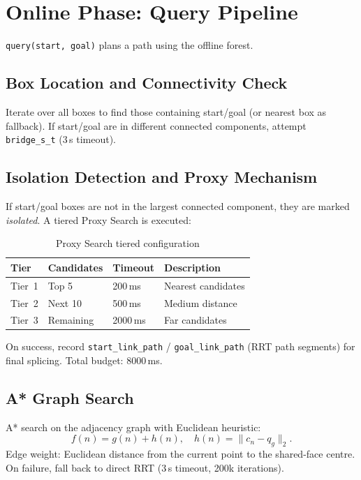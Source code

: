 \documentclass[journal]{IEEEtran}
\begin{document}
\section{Online Phase: Query Pipeline}\label{sec:query}

\texttt{query(start, goal)} plans a path using the offline forest.

\subsection{Box Location and Connectivity Check}

Iterate over all boxes to find those containing start/goal
(or nearest box as fallback).
If start/goal are in different connected components, attempt
\texttt{bridge\_s\_t} (3\,s timeout).

\subsection{Isolation Detection and Proxy Mechanism}

If start/goal boxes are not in the largest connected component,
they are marked \emph{isolated}.
A tiered Proxy Search is executed:

\begin{table}[ht]
\centering
\caption{Proxy Search tiered configuration}
\label{tab:proxy}
\begin{tabular}{@{}llll@{}}
\toprule
\textbf{Tier} & \textbf{Candidates} & \textbf{Timeout} & \textbf{Description} \\
\midrule
Tier~1 & Top 5 & 200\,ms & Nearest candidates \\
Tier~2 & Next 10 & 500\,ms & Medium distance \\
Tier~3 & Remaining & 2000\,ms & Far candidates \\
\bottomrule
\end{tabular}
\end{table}

On success, record \texttt{start\_link\_path} /
\texttt{goal\_link\_path} (RRT path segments) for final splicing.
Total budget: 8000\,ms.

\subsection{A* Graph Search}

A* search on the adjacency graph with Euclidean heuristic:
\begin{equation}
  f(n) = g(n) + h(n), \quad h(n) = \|c_n - q_g\|_2.
\end{equation}
Edge weight: Euclidean distance from the current point to the
shared-face centre.
On failure, fall back to direct RRT (3\,s timeout, 200k iterations).
\end{document}

